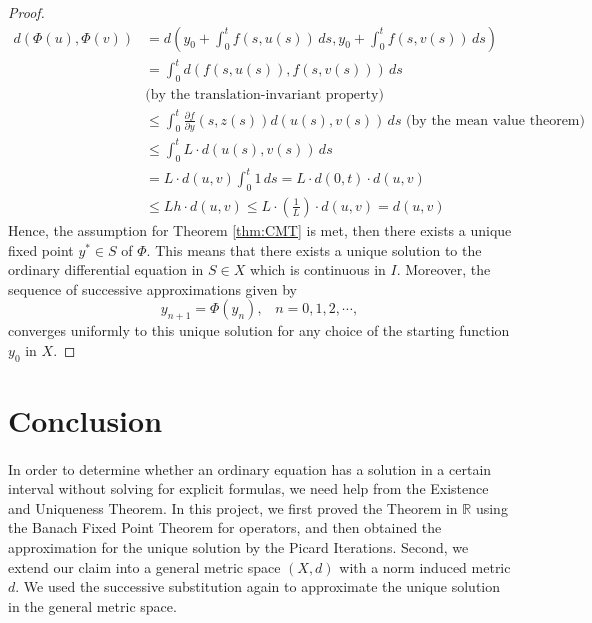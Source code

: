\documentclass{article}
\theoremstyle{definition}
\theoremstyle{remark}
\theoremstyle{example}
\begin{document}
\begin{proof}
    \begin{align}
        d(\Phi(u),\Phi(v)) &= d\left(y_0+\int_{0}^{t}{f(s,u(s))}\,ds, y_0+\int_{0}^{t}{f(s,v(s))}\,ds\right)\\
        &= \int_{0}^{t}{d(f(s,u(s)), f(s,v(s)))}\,ds\\
        &\text{(by the translation-invariant property)}\\
        &\leq \int_{0}^{t}{\tfrac{\partial f}{\partial y}(s,z(s))d(u(s),v(s))}\,ds \text{ (by the mean value theorem)}\\
        &\leq \int_{0}^{t}{L \cdot d(u(s),v(s))}\,ds\\
        &= L\cdot d(u,v) \int_{0}^{t}{1}\,ds = L \cdot d(0,t) \cdot d(u,v)\\
        &\leq Lh\cdot d(u,v) \leq L \cdot (\tfrac{1}{L})\cdot d(u,v) = d(u,v)
    \end{align}
    Hence, the assumption for Theorem \ref{thm:CMT} is met, then there exists a unique fixed point $y^{*} \in S$ of $\Phi$. This means that there exists a unique solution to the ordinary differential equation in $S \in X$ which is continuous in $I$. Moreover, the sequence of successive approximations given by
    \begin{equation}
       y_{n+1} = \Phi(y_n), \; \; \; n = 0, 1, 2, \cdots,
    \end{equation}
    converges uniformly to this unique solution for any choice of the starting function $y_0$ in $X$.
\end{proof}

\section{Conclusion}

\paragraph{  }

In order to determine whether an ordinary equation has a solution in a certain interval without solving for explicit formulas, we need help from the Existence and Uniqueness Theorem. In this project, we first proved the Theorem in $\mathbb{R}$ using the Banach Fixed Point Theorem for operators, and then obtained the approximation for the unique solution by the Picard Iterations. Second, we extend our claim into a general metric space $(X,d)$ with a norm induced metric $d$. We used the successive substitution again to approximate the unique solution in the general metric space.

\newpage


\end{document}
